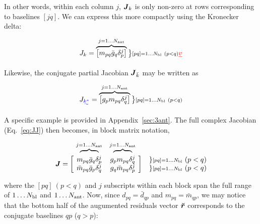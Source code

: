 \documentclass[useAMS,usenatbib]{mn2e}
\makeatletter
\newcommand{\mat}[1]{{\bmath{#1}}}
\newcommand{\JJ}{\mat{J}} %
\newcommand{\Matrix}[2]{\left [ \begin{array}{@{}#1@{}}#2\end{array} \right ]}
\newcommand{\Stack}[1]{\begin{array}{@{}c@{}}#1\end{array}}
\newcommand{\AUG}[1]{\bmath{\breve{#1}}}
\newcommand{\Rr}{\AUG{r}}
\numberwithin{equation}{section} %
\providecommand{\DIFadd}[1]{{\protect\color{blue}\uwave{#1}}} %
\providecommand{\DIFdel}[1]{{\protect\color{red}\sout{#1}}}                      %
\providecommand{\DIFaddbegin}{} %
\providecommand{\DIFaddend}{} %
\providecommand{\DIFdelbegin}{} %
\providecommand{\DIFdelend}{} %
\makeatother
\begin{document}
In other words, within each column $j$, $\JJ_k$ is only non-zero at rows corresponding to baselines $[jq]$. We can express 
this more compactly using the Kronecker delta:
\DIFdelbegin %

\DIFdelend \begin{equation}
\label{eq:Jk}
J_k = \overbrace{ \Matrix{c}{ m_{pq}\bar{g}_q\delta^{j}_p } } ^{j=1\dots \Na} \big \}{\scriptstyle [pq]=1\dots \Nbl~(p<q)}
\DIFdelbegin \DIFdel{v}\DIFdelend \end{equation}
\DIFdelbegin %

\DIFdelend Likewise, the conjugate partial Jacobian \DIFdelbegin \DIFdel{$\JJ_{\bar{k}}$ }\DIFdelend \DIFaddbegin \DIFadd{$J_{k^*}$ }\DIFaddend may be written as
\DIFdelbegin %

\DIFdelend \begin{equation}
\label{eq:Jbark}
J_{\DIFdelbegin %
\DIFdelend \DIFaddbegin \DIFadd{k^*}\DIFaddend } = \overbrace{ \Matrix{c}{ g_p m_{pq} \delta^{j}_q } } ^{j=1\dots \Na} \big \}{\scriptstyle [pq]=1\dots \Nbl~(p<q)}
\end{equation}
\DIFdelbegin %

\DIFdelend A specific example is provided in Appendix~\ref{sec:3ant}. The full complex Jacobian (Eq.~\ref{eq:JJ}) then 
becomes, in block matrix notation,
\DIFdelbegin %

\DIFdelend \begin{equation}
\label{eq:JJ:di:basic}
\begin{array}{r@{~}cc@{~}cc}
                & \overbrace{~~~~~~~~}^{j=1\dots \Na} & \overbrace{~~~~~~~~}^{j=1\dots \Na} \\
\JJ = \bigg [ &
  \Stack{ m_{pq}\bar{g}_q\delta^{j}_p \\ \bar{m}_{pq} \bar{g}_p \delta^{j}_q } &
  \Stack{ g_p m_{pq} \delta^{j}_q \\ g_q \bar{m}_{pq} \delta^{j}_p }  
& \bigg ] &
\Stack{ \} {\scriptstyle [pq]=1\dots \Nbl}~(p<q) \\ \} {\scriptstyle [pq]=1\dots \Nbl}~(p<q) }
\DIFdelbegin %

\DIFdelend \end{array}
\end{equation}
\DIFdelbegin %

\DIFdelend where the $[pq]~(p<q)$ and $j$ subscripts within each block span the full range of $1\dots N_\mathrm{bl}$ and 
$1\dots N_\mathrm{ant}$. Now, since $d_{pq} = \bar{d}_{qp}$ and $m_{pq} = \bar{m}_{qp}$, we may notice
that the bottom half of the augumented residuals vector $\Rr$ corresponds to the conjugate baselines 
$qp$ ($q>p$):
\DIFdelbegin %
\end{document}
